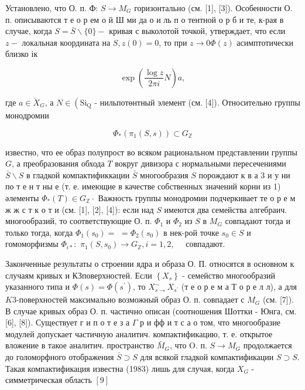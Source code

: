 \documentclass[10pt]{article}
\begin{document}
Установлено, что О. п. Ф: $S \rightarrow M_{G}$ горизонтально (см. [1], [3]). Особенности О. п. описываются т е о р ем о й Ш ми да о и ль п о тентной о р б и те, к-рая в случае, когда $S=\bar{S} \backslash\{0\}-$ кривая с выколотой точкой, утверждает, что если $z-$ локальная координата на $S, z(0)=0$, то при $z \rightarrow 0 \Phi(z)$ асимптотически близко ік

\[
\exp \left(\frac{\log z}{2 \pi i} N\right) a,
\]

где $a \in \breve{X}_{G}$, а $N \in\left(\mathrm{Si}_{\mathrm{Q}}\right.$ - нильпотөнтный элемент (см. [4]). Относительно группы монодромии

\[
\Phi_{*}\left(\pi_{1}(S, s)\right) \subset G_{\mathbb{Z}}
\]

известно, что ее образ полупрост во всяком рациональном представлении группы $G$, а преобразования обхода $T$ вокруг дивизора с нормальными пересечениями $\bar{S} \backslash S$ в гладкой компактификкации $\bar{S}$ многообразия $S$ порождают к в а 3 и у ни по т е н т ны е (т. е. имеющие в качестве собственных значений корни из 1) әлементы $\Phi_{*}(T) \in G_{\mathbb{Z}} \cdot$ Важность группы монодромии подчеркивает те о р е м ж ж с т к о т и (см. [1], [2], [4]): если над $S$ имеются два семейства алгебраич. мноғообразий, то соответствующие О. п. $\Phi_{1}$ и $\Phi_{2}$ из $S$ в $M_{G}$ совпадают тогда и только тогда, когда $\Phi_{1}\left(s_{0}\right)=$ $=\Phi_{2}\left(s_{0}\right)$ в нек-рой точке $s_{0} \in S$ и гомоморфизмы $\Phi_{i *}:$ $\pi_{1}\left(S, s_{0}\right) \rightarrow G_{\mathbb{Z}}, i=1,2, \quad$ совпадают.

Законченные результаты о строении ядра и образа О. П. относятся в основном к случаям кривых и КЗповерхностей. Если $\left\{X_{s}\right\}$ - семейство многообразий указанного типа и $\Phi(s)=\Phi\left(s^{\prime}\right)$, то $X_{s \rightarrow}^{\sim} X_{s^{\prime}}$ (т е о р е м а Т о р е л л), а для $K 3$-поверхностей максимально возможный образ О. п. совпадает с $M_{G}$ (см. [7]). В случае кривых образ О. п. частично описан (соотношения Шоттки - Юнга, см. [6], [8]). Существует г и п о т е з а $\Gamma$ р и фф и т с а о том, что многообразие модулей допускает частичную аналитич. компактификацию, т. е. открытое вложение в такое аналитич. пространство $\bar{M}_{G}$, что O. п. $S \rightarrow M_{G}$ продолжается до голоморфного отображения $\bar{S} \supset S$ для всякой гладкой компактификации $S \supset S$. Такая компактификация известна (1983) лишь для случая, когда $X_{G}$ - симметрическая область $[9]$
\end{document}
